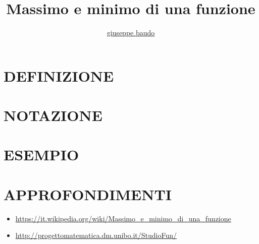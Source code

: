 \documentclass[a4paper,10pt]{article}
\title{Massimo e minimo di una funzione}
\author{\href{http://www.baudo.hol.es}{giuseppe baudo}}
\begin{document}
\maketitle

\section{DEFINIZIONE}

\section{NOTAZIONE}

\section{ESEMPIO}

\section{APPROFONDIMENTI}
\begin{itemize}
 \item \href{https://it.wikipedia.org/wiki/Massimo_e_minimo_di_una_funzione}{https://it.wikipedia.org/wiki/Massimo_e_minimo_di_una_funzione}
 \item \href{http://progettomatematica.dm.unibo.it/StudioFun/}{http://progettomatematica.dm.unibo.it/StudioFun/}
\end{itemize}
\end{document}
